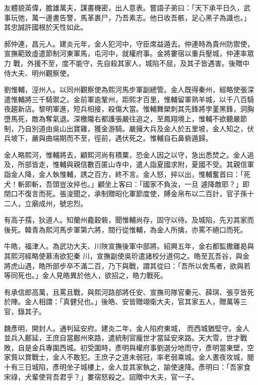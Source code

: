 \begin{pinyinscope}
 友體貌英偉，膽雄萬夫，謀畫機密，出人意表。嘗語子弟曰：「天下承平日久，武事玩弛，萬一邊書告警，馬革裹尸，乃吾素志。他日收吾骸，足心黑子為識也。」其忠誠許國根於天性如此。



 郝仲連，昌元人。建炎元年，金人犯河中，守臣席益遁去。仲連時為貴州防禦使，宣撫範致虛遣節制河東軍馬，屯河中，就權府事。金將婁宿以重兵壓城，仲連率眾力
 戰，外援不至，度不能守，先自殺其家人，城陷不屈，及其子皆遇害。後贈中侍大夫、明州觀察使。



 劉惟輔，涇州人。以同州觀察使為熙河馬步軍副總管。金人既得秦州，經略使張深遣惟輔將三千騎禦之。金前軍逾鞏州，距熙才百里，惟輔留軍熟羊城，以千八百騎夜趨新店。黎明軍進，短兵相接，殺傷大當。惟輔舞槊刺其先鋒將孛堇黑鋒，洞胸墮馬死，敵為奪氣退。深檄隴右都護張嚴往追之，至鳳翔境上，惟輔不欲聽嚴節
 制，乃自別道由吳山出寶雞，獲金游騎。嚴擁大兵及金人於五里坡，金人知之，伏兵坡下，嚴與曲端期而不至，徑前，遇伏死之。惟輔自石鼻砦遁歸。



 金人略熙河，惟輔將去，顧熙河尚有積粟，恐金人因之以守，急出悉焚之。金人追及，所部皆走，惟輔與親信數百匿山寺中，遣人詣夏國求附，夏國不受。其親信軍詣金人降，金人執惟輔，誘之百方，終不言。金人怒，捽以出，惟輔奮首曰：「死犬！斬即斬，吾頭豈汝捽也。」顧坐上客曰：「國家不負汝，一旦
 遽降敵耶？」即閉口不復言而死。張浚聞之，承制贈昭化軍節度使，賻金帛布以二百計，官子孫十二人，立廟成州，號忠烈。



 有高子孺，狄道人。知蘭州龕穀砦，聞惟輔尚存，固守以待。及城陷，先刃其家而後死。韓青為熙河馬步軍第六將，間行從惟輔，為金人所擒，亦罵不絕口而死。



 牛皓，福津人。為武功大夫、川陜宣撫後軍中部將。紹興五年，金右都監撒離曷與其熙河經略使慕洧欲犯秦
 川，宣撫副使吳玠遣諸校分道伺之。皓至瓦吾谷，與金將虎山遇，皓所部步卒不滿二百，乃下與戰，謂其從曰：「吾所以舍馬者，欲與若等同死也。」金人見皓異於他人，欲招之，皓力戰死。



 有承信郎高萬，且罵且戰，與熙河路部將任安、宣撫司隊官秦元、薛琪、張亨皆死於陣。金人相謂：「真健兒也。」後皓、安皆贈翊衛大夫，官其家五人，贈萬等三官，錄其子。



 魏彥明，開封人。通判延安府。建炎二年，金人陷府東城，
 而西城猶堅守。金人並兵入鄜延，王庶自當鄜州來路，遣統制官龐世才當延安來路。天大雪，世才戰敗，自是金兵專圍西城。初受圍時，彥明與權府事劉選分地而守，彥明當東壁，空家貲以賞戰士，金人不敢犯。王庶子之道未弱冠，率老弱乘城。金人晝夜攻城，閱十有三日城陷，彥明坐子城樓上，金人並其家執之，諭使速降。彥明曰：「吾家食宋祿，犬輩使背吾君乎？」婁宿怒殺之。詔贈中大夫，官一子。




\end{pinyinscope}
